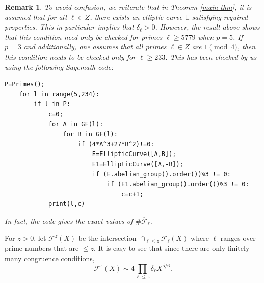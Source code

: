 \documentclass[12pt]{amsart}
\newtheorem{remark}[theorem]{Remark}
\newcommand{\cF}{\mathcal{F}}
\numberwithin{equation}{section}
\begin{document}
\begin{remark}\label{remark with code}
    To avoid confusion, we reiterate that in Theorem \ref{main thm}, it is assumed that for all $\ell\in Z$, there exists an elliptic curve $\mathbb{E}$ satisfying required properties. This in particular implies that $\delta_\ell>0$. However, the result above shows that this condition need only be checked for primes $\ell\geq 5779$ when $p=5$. If $p=3$ and additionally, one assumes that all primes $\ell\in Z$ are $1\pmod{4}$, then this condition needs to be checked only for $\ell\geq 233$. This has been checked by us using the following Sagemath code:
    \begin{verbatim}
P=Primes();
    for l in range(5,234):
        if l in P:
            c=0;
            for A in GF(l):
                for B in GF(l):
                    if (4*A^3+27*B^2)!=0:
                        E=EllipticCurve([A,B]);
                        E1=EllipticCurve([A,-B]);
                        if (E.abelian_group().order())%3 != 0:
                            if (E1.abelian_group().order())%3 != 0:
                                c=c+1;
            print(l,c)
\end{verbatim}
In fact, the code gives the exact values of $\#\overline{\cF}_\ell$. 
\end{remark}

For $z>0$, let $\cF^z(X)$ be the intersection $\cap_{\ell\leq z} \cF_\ell(X)$ where $\ell$ ranges over prime numbers that are $\leq z$. It is easy to see that since there are only finitely many congruence conditions, 
\begin{equation}\label{finitely many cong}\cF^z(X)\sim 4 \prod_{\ell\leq z} \delta_\ell X^{5/6}.\end{equation} 
\end{document}
